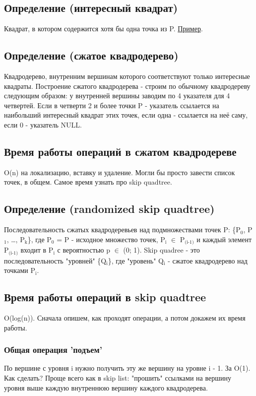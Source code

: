\documentclass[11pt]{article}
\begin{document}
\subsection{Определение (интересный квадрат)}
\label{sec:orgheadline4}
Квадрат, в котором содержится хотя бы одна точка из P. \href{http://neerc.ifmo.ru/wiki/images/e/ea/Compressed_Quadtree.png}{Пример}.
\subsection{Определение (сжатое квадродерево)}
\label{sec:orgheadline5}
Квадродерево, внутренним вершинам которого соответствуют только
интересные квадраты.
Построение сжатого квадродерева - строим по обычному квадродереву
следующим образом: у внутренней вершины заводим по 4 указателя для
4 четвертей. Если в четверти 2 и более точки P - указатель
ссылается на наибольший интересный квадрат этих точек, если одна -
ссылается на неё саму, если 0 - указатель NULL.
\subsection{Время работы операций в сжатом квадродереве}
\label{sec:orgheadline6}
O(n) на локализацию, вставку и удаление. Могли бы просто завести
список точек, в общем. Самое время узнать про skip quadtree.
\subsection{Определение (randomized skip quadtree)}
\label{sec:orgheadline7}
Последовательность сжатых квадродеревьев над подмножествами точек
P: \{P\(_{\text{0}}\), P\(_{\text{1}}\), \ldots{}, P\(_{\text{k}}\)\}, где P\(_{\text{0}}\) = P - исходное множество точек,
P\(_{\text{i}}\) \(\in\) P\(_{\text{(i-1)}}\) и каждый элемент P\(_{\text{(i-1)}}\) входит в P\(_{\text{i}}\) с
вероятностью p \(\in\) (0; 1). Skip quadree - это последовательность
"уровней" \{Q\(_{\text{i}}\)\}, где "уровень" Q\(_{\text{i}}\) - сжатое квадродерево над
точками P\(_{\text{i}}\).
\subsection{Время работы операций в skip quadtree}
\label{sec:orgheadline15}
O(log(n)). Сначала опишем, как проходят операции, а потом докажем
их время работы.
\subsubsection{Общая операция 'подъем'}
\label{sec:orgheadline8}
По вершине с уровня i нужно получить эту же вершину на уровне
i - 1. За O(1). Как сделать? Проще всего как в skip list:
"прошить" ссылками на вершину уровня выше каждую внутреннюю
вершину каждого квадродерева.
\end{document}
